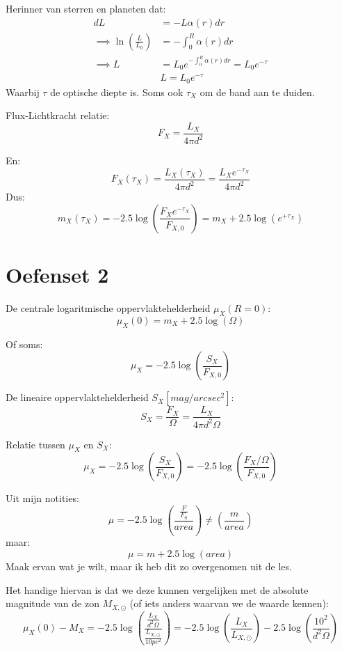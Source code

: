 \documentclass[a4paper,twoside]{article}
\theoremstyle{definition}
\theoremstyle{plain}
\begin{document}
Herinner van sterren en planeten dat:
\begin{align*}
    dL &= -L\alpha(r)dr\\
    \implies \ln \left( \frac{L}{L_0} \right) &= -\int_0^R \alpha(r) dr\\
    \implies L &= L_0 e^{-\int_0^R \alpha(r) dr} = L_0 e^{-\tau}\\
    &\boxed{L = L_0 e^{-\tau}}
\end{align*}
Waarbij $\tau$ de optische diepte is. Soms ook \(\tau_X\) om de band aan te duiden.


Flux-Lichtkracht relatie:
\begin{equation}
    F_X = \frac{L_X}{4 \pi d^2}
\end{equation}

En:
\[
F_X(\tau_X) = \frac{L_X(\tau_X)}{4 \pi d^2} = \frac{L_{X} e^{-\tau_X}}{4 \pi d^2}
\]
Dus:
\[
m_X (\tau_X) = -2.5 \log \left( \frac{F_X  e^{-\tau_X}}{F_{X,0}} \right) = m_X + 2.5 \log \left( e^{+\tau_X} \right)
\]


\section{Oefenset 2}

De centrale logaritmische oppervlaktehelderheid \(\mu_X (R=0)\):
\begin{equation}
    \mu_X (0) = m_X + 2.5 \log \left(\Omega \right)
\end{equation}

Of soms:
\[ 
\mu_X = -2.5 \log \left(\frac{S_X}{F_{X,0}}\right)
\]

De lineaire oppervlaktehelderheid \(S_X [mag/arcsec^2]\):
\begin{equation}
    S_X = \frac{F_X}{\Omega} = \frac{L_X}{4 \pi d^2 \Omega}
\end{equation}

Relatie tussen \(\mu_X\) en \(S_X\):
\begin{equation}
    \mu_X = -2.5 \log \left( \frac{S_X}{F_{X,0}} \right) = -2.5 \log \left( \frac{F_X/\Omega}{F_{X,0}} \right) 
\end{equation}  

Uit mijn notities:
\[
\mu = -2.5\log\left(\frac{\frac{F}{F_0}}{area}\right) \neq\left(\frac{m}{area}\right)
\]
maar:
\[
\mu = m + 2.5 \log (area)
\]
Maak ervan wat je wilt, maar ik heb dit zo overgenomen uit de les.

Het handige hiervan is dat we deze kunnen vergelijken met de absolute magnitude van de zon \(M_{X,\odot}\) (of iets anders waarvan we de waarde kennen):
\begin{equation}
    \mu_X (0) - M_X = -2.5 \log \left( \frac{\frac{L_X}{d^2\Omega}}{\frac{L_{X,\odot}}{10pc^2}} \right) = -2.5 \log \left( \frac{L_X}{L_{X,\odot}} \right) - 2.5 \log \left( \frac{10^2}{d^2\Omega} \right)
\end{equation}
\end{document}
